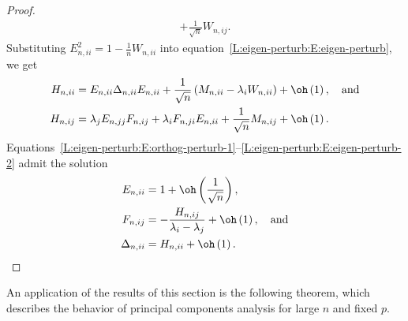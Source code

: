 \begin{proof}
\begin{subequations}
\begin{align}
         + 
         \frac{1}{\sqrt{n}} W_{n,ij}.
         \label{L:eigen-perturb:E:orthog-perturb-2}
\end{align}
\end{subequations}
Substituting
\(
    E_{n,ii}^2 = 1 - \frac{1}{n} W_{n,ii}
\)
into equation~\eqref{L:eigen-perturb:E:eigen-perturb}, we get
\begin{subequations}
\begin{align}
    H_{n,ii} 
        &= E_{n,ii} \Delta_{n,ii} E_{n,ii}
           + 
           \frac{1}{\sqrt{n}} \left(
                M_{n,ii} - \lambda_i W_{n,ii}
           \right)
           +
           \oh \left( 1 \right), \quad \text{and} 
           \label{L:eigen-perturb:E:eigen-perturb-1} \\
    H_{n,ij}
        &= \lambda_j E_{n,jj} F_{n,ij}
           +
           \lambda_i F_{n,ji} E_{n,ii} 
           +
           \frac{1}{\sqrt{n}} M_{n,ij}
           +
           \oh \left( 1 \right).
           \label{L:eigen-perturb:E:eigen-perturb-2} 
\end{align}
\end{subequations}
Equations~\eqref{L:eigen-perturb:E:orthog-perturb-1}--\eqref{L:eigen-perturb:E:eigen-perturb-2} admit the solution
\begin{subequations}
\begin{align}
    E_{n,ii} 
        &= 1 + \oh\left(\frac{1}{\sqrt{n}}\right), \\
    F_{n,ij}
        &= -
           \frac{ H_{n,ij} }
                { \lambda_i - \lambda_j }
           +
           \oh \left( 1 \right), \quad \text{and} \\
    \Delta_{n,ii}
        &= H_{n,ii} + \oh\left( 1 \right).
\end{align}
\end{subequations}
\end{proof}

An application of the results of this section is the following theorem, which describes the behavior of principal components analysis for large $n$ and fixed $p$.

